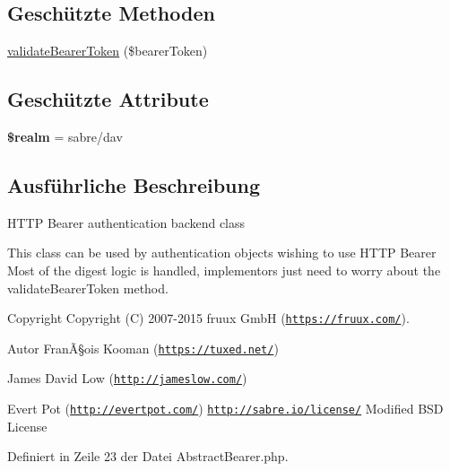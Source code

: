 \subsection*{Geschützte Methoden}
\begin{DoxyCompactItemize}
\item 
\mbox{\hyperlink{class_sabre_1_1_d_a_v_1_1_auth_1_1_backend_1_1_abstract_bearer_a46ee5dcc2d55566e686b4da20450189f}{validate\+Bearer\+Token}} (\$bearer\+Token)
\end{DoxyCompactItemize}
\subsection*{Geschützte Attribute}
\begin{DoxyCompactItemize}
\item 
\mbox{\label{class_sabre_1_1_d_a_v_1_1_auth_1_1_backend_1_1_abstract_bearer_ab37dc03ef4f3785b0006640cc3afa2c7}} 
{\bfseries \$realm} = \textquotesingle{}sabre/dav\textquotesingle{}
\end{DoxyCompactItemize}


\subsection{Ausführliche Beschreibung}
H\+T\+TP Bearer authentication backend class

This class can be used by authentication objects wishing to use H\+T\+TP Bearer Most of the digest logic is handled, implementors just need to worry about the validate\+Bearer\+Token method.

\begin{DoxyCopyright}{Copyright}
Copyright (C) 2007-\/2015 fruux GmbH (\href{https://fruux.com/}{\tt https\+://fruux.\+com/}). 
\end{DoxyCopyright}
\begin{DoxyAuthor}{Autor}
FranÃ§ois Kooman (\href{https://tuxed.net/}{\tt https\+://tuxed.\+net/}) 

James David Low (\href{http://jameslow.com/}{\tt http\+://jameslow.\+com/}) 

Evert Pot (\href{http://evertpot.com/}{\tt http\+://evertpot.\+com/})  \href{http://sabre.io/license/}{\tt http\+://sabre.\+io/license/} Modified B\+SD License 
\end{DoxyAuthor}


Definiert in Zeile 23 der Datei Abstract\+Bearer.\+php.



